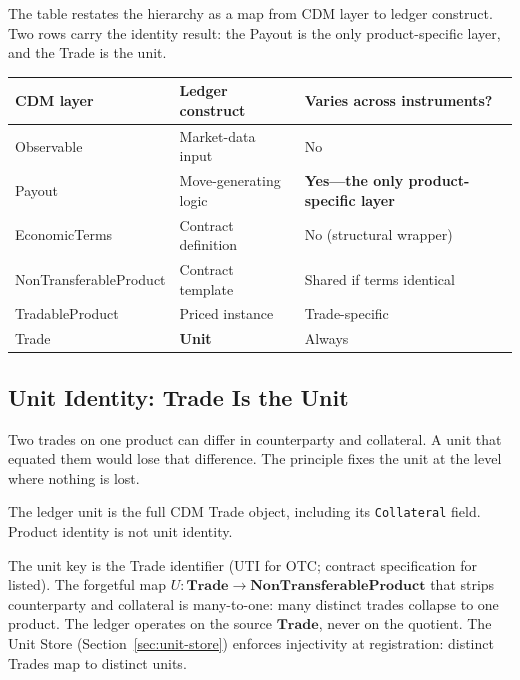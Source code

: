 The table restates the hierarchy as a map from CDM layer to ledger construct. Two rows carry the identity result: the Payout is the only product-specific layer, and the Trade is the unit.

\begin{center}\small
\begin{tabular}{lll}
\toprule
\textbf{CDM layer} & \textbf{Ledger construct} & \textbf{Varies across instruments?} \\
\midrule
Observable & Market-data input & No \\
Payout & Move-generating logic & \textbf{Yes---the only product-specific layer} \\
EconomicTerms & Contract definition & No (structural wrapper) \\
NonTransferableProduct & Contract template & Shared if terms identical \\
TradableProduct & Priced instance & Trade-specific \\
Trade & \textbf{Unit} & Always \\
\bottomrule
\end{tabular}
\end{center}

\subsection{Unit Identity: Trade Is the Unit}
\label{sec:cdm-trade}

Two trades on one product can differ in counterparty and collateral. A unit that equated them would lose that difference. The principle fixes the unit at the level where nothing is lost.

\begin{principle}[Trade $=$ Unit]
The ledger unit is the full CDM Trade object, including its \texttt{Collateral} field. Product identity is not unit identity.
\end{principle}

The unit key is the Trade identifier (UTI for OTC; contract specification for listed). The forgetful map $U:\mathbf{Trade}\to\mathbf{NonTransferableProduct}$ that strips counterparty and collateral is many-to-one: many distinct trades collapse to one product. The ledger operates on the source $\mathbf{Trade}$, never on the quotient. The Unit Store (Section~\ref{sec:unit-store}) enforces injectivity at registration: distinct Trades map to distinct units.

